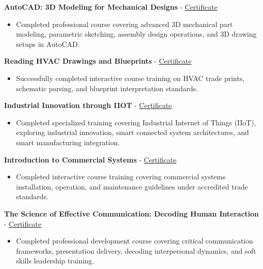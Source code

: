 \documentclass[10pt, letterpaper]{article}
\newcommand{\projheadlink}[3]{\vspace{5pt}\textbf{#1} - \href{#3}{\textcolor{linkblue}{\underline{#2}}}\par\vspace{1pt}}
\begin{document}
\projheadlink{AutoCAD: 3D Modeling for Mechanical Designs}{Certificate}{https://www.linkedin.com/posts/jaykumar-prajapati_certificate-of-completion-activity-7304735154567069696-9l30?utm_source=share&utm_medium=member_desktop&rcm=ACoAACTudPwBarslMoaDRLUtsgPBCNBE1dj2h5o}
\begin{itemize}
  \item Completed professional course covering advanced 3D mechanical part modeling, parametric sketching, assembly design operations, and 3D drawing setups in AutoCAD.
\end{itemize}

\projheadlink{Reading HVAC Drawings and Blueprints}{Certificate}{https://www.linkedin.com/posts/jaykumar-prajapati_reading-hvac-drawings-and-blueprints-activity-7320156133556371456-fMJK?utm_source=share&utm_medium=member_desktop&rcm=ACoAACTudPwBarslMoaDRLUtsgPBCNBE1dj2h5o}
\begin{itemize}
  \item Successfully completed interactive course training on HVAC trade prints, schematic parsing, and blueprint interpretation standards.
\end{itemize}

\projheadlink{Industrial Innovation through IIOT}{Certificate}{https://www.linkedin.com/posts/jaykumar-prajapati_certificate-iiot-activity-7328141768636432386-HbRX?utm_source=share&utm_medium=member_desktop&rcm=ACoAACTudPwBarslMoaDRLUtsgPBCNBE1dj2h5o}
\begin{itemize}
  \item Completed specialized training covering Industrial Internet of Things (IIoT), exploring industrial innovation, smart connected system architectures, and smart manufacturing integration.
\end{itemize}

\projheadlink{Introduction to Commercial Systems}{Certificate}{https://www.linkedin.com/posts/jaykumar-prajapati_introduction-to-commercial-systems-activity-7305475773417631744-22GN?utm_source=share&utm_medium=member_desktop&rcm=ACoAACTudPwBarslMoaDRLUtsgPBCNBE1dj2h5o}
\begin{itemize}
  \item Completed interactive course training covering commercial systems installation, operation, and maintenance guidelines under accredited trade standards.
\end{itemize}

\projheadlink{The Science of Effective Communication: Decoding Human Interaction}{Certificate}{https://www.linkedin.com/posts/jaykumar-prajapati_the-science-of-effective-communication-activity-7315065329318014976-reAg?utm_source=share&utm_medium=member_desktop&rcm=ACoAACTudPwBarslMoaDRLUtsgPBCNBE1dj2h5o}
\begin{itemize}
  \item Completed professional development course covering critical communication frameworks, presentation delivery, decoding interpersonal dynamics, and soft skills leadership training.
\end{itemize}
\end{document}
